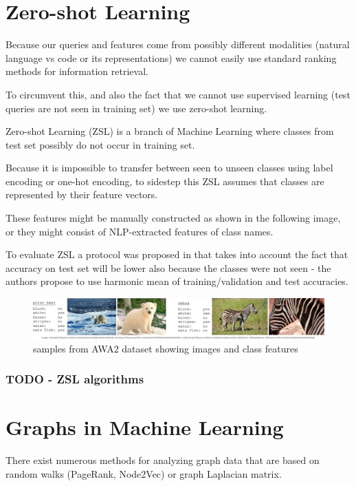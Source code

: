 \documentclass[11pt]{report}
\begin{document}
\section{Zero-shot Learning}

Because our queries and features come from possibly different modalities (natural language vs code or its representations) we cannot easily use standard ranking methods for information retrieval.

To circumvent this, and also the fact that we cannot use supervised learning (test queries are not seen in training set) we use zero-shot learning.

Zero-shot Learning (ZSL) is a branch of Machine Learning where classes from test set possibly do not occur in training set.

Because it is impossible to transfer between seen to unseen classes using label encoding or one-hot encoding, to sidestep this ZSL assumes that classes are represented by their feature vectors.

These features might be manually constructed as shown in the following image, or they might consist of NLP-extracted features of class names.

To evaluate ZSL a protocol was proposed in \cite{zsl_good_bad} that takes into account the fact that accuracy on test set will be lower also because the classes were not seen - the authors propose to use harmonic mean of training/validation and test accuracies.

\begin{figure}[htbp]
\centering
\includegraphics[width=.9\linewidth]{./img/awa2.jpg}
\caption{samples from AWA2 dataset showing images and class features}
\end{figure}

\subsubsection{{\bfseries\sffamily TODO} - ZSL algorithms}


\section{Graphs in Machine Learning}

There exist numerous methods for analyzing graph data that are based on random walks (PageRank, Node2Vec) or graph Laplacian matrix.
\end{document}
